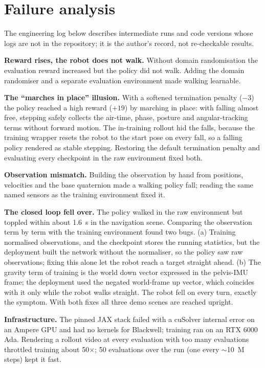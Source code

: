 \documentclass[conference,10pt]{IEEEtran}
\begin{document}
\section{Failure analysis}\label{sec:fail}
The engineering log below describes intermediate runs and code versions whose logs are not in the repository; it is
the author's record, not re-checkable results.

\textbf{Reward rises, the robot does not walk.} Without domain randomisation the evaluation reward increased but the
policy did not walk. Adding the domain randomiser and a separate evaluation environment made walking learnable.

\textbf{The ``marches in place'' illusion.} With a softened termination penalty ($-3$) the policy reached a high reward
($+19$) by marching in place: with falling almost free, stepping safely collects the air-time, phase, posture and
angular-tracking terms without forward motion. The in-training rollout hid the falls, because the training wrapper resets
the robot to the start pose on every fall, so a falling policy rendered as stable stepping. Restoring the default
termination penalty and evaluating every checkpoint in the raw environment fixed both.

\textbf{Observation mismatch.} Building the observation by hand from positions, velocities and the base quaternion made a
walking policy fall; reading the same named sensors as the training environment fixed it.

\textbf{The closed loop fell over.} The policy walked in the raw environment but toppled within about 1.6~s in the
navigation scene. Comparing the observation term by term with the training environment found two bugs. (a) Training
normalised observations, and the checkpoint stores the running statistics, but the deployment built the network without
the normaliser, so the policy saw raw observations; fixing this alone let the robot reach a target straight ahead.
(b) The gravity term of training is the world down vector expressed in the pelvis-IMU frame; the deployment used the
negated world-frame up vector, which coincides with it only while the robot walks straight. The robot fell on every
turn, exactly the symptom. With both fixes all three demo scenes are reached upright.

\textbf{Infrastructure.} The pinned JAX stack failed with a cuSolver internal error on an Ampere GPU and had no kernels
for Blackwell; training ran on an RTX 6000 Ada. Rendering a rollout video at every evaluation with too many evaluations
throttled training about 50$\times$; 50 evaluations over the run (one every $\sim$10~M steps) kept it fast.
\end{document}
